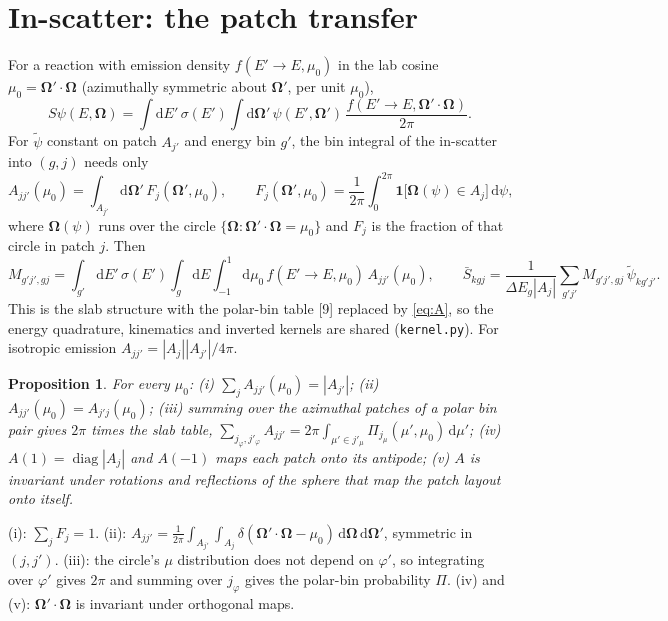 \documentclass[11pt]{article}
\newtheorem{proposition}{Proposition}
\newcommand{\tpsi}{\tilde\psi}
\newcommand{\Sbar}{\bar S}
\newcommand{\Om}{\boldsymbol\Omega}
\begin{document}
\section{In-scatter: the patch transfer}

For a reaction with emission density $f(E'\!\to E,\mu_0)$ in the lab cosine
$\mu_0=\Om'\cdot\Om$ (azimuthally symmetric about $\Om'$, per unit $\mu_0$),
\begin{equation}
  S\psi(E,\Om) = \int\!\mathrm dE'\,\sigma(E')\int\!\mathrm d\Om'\,
  \psi(E',\Om')\,\frac{f(E'\!\to E,\Om'\cdot\Om)}{2\pi}.
\end{equation}
For $\tpsi$ constant on patch $A_{j'}$ and energy bin $g'$, the bin integral of the
in-scatter into $(g,j)$ needs only
\begin{equation}
  A_{jj'}(\mu_0) = \int_{A_{j'}}\!\mathrm d\Om'\,F_j(\Om',\mu_0),
  \qquad F_j(\Om',\mu_0) = \frac{1}{2\pi}\int_0^{2\pi}
  \mathbf 1\big[\Om(\psi)\in A_j\big]\,\mathrm d\psi ,
  \label{eq:A}
\end{equation}
where $\Om(\psi)$ runs over the circle $\{\Om:\Om'\cdot\Om=\mu_0\}$ and $F_j$ is the
fraction of that circle in patch $j$. Then
\begin{equation}
  M_{g'j',gj} = \int_{g'}\!\mathrm dE'\,\sigma(E')\int_g\!\mathrm dE\int_{-1}^1
  \!\mathrm d\mu_0\, f(E'\!\to E,\mu_0)\,A_{jj'}(\mu_0),\qquad
  \Sbar_{kgj} = \frac{1}{\Delta E_g|A_j|}\sum_{g'j'}M_{g'j',gj}\,\tpsi_{kg'j'} .
\end{equation}
This is the slab structure with the polar-bin table [9] replaced by \eqref{eq:A}, so
the energy quadrature, kinematics and inverted kernels are shared
(\texttt{kernel.py}). For isotropic emission $A_{jj'} = |A_j||A_{j'}|/4\pi$.

\begin{proposition}
For every $\mu_0$: (i) $\sum_j A_{jj'}(\mu_0) = |A_{j'}|$; (ii)
$A_{jj'}(\mu_0)=A_{j'j}(\mu_0)$; (iii) summing over the azimuthal patches of a polar
bin pair gives $2\pi$ times the slab table,
$\sum_{j_\varphi,j'_\varphi} A_{jj'} = 2\pi\int_{\mu'\in j'_\mu}\Pi_{j_\mu}(\mu',\mu_0)
\,\mathrm d\mu'$; (iv) $A(1) = \operatorname{diag}|A_j|$ and $A(-1)$ maps each patch
onto its antipode; (v) $A$ is invariant under rotations and reflections of the sphere
that map the patch layout onto itself.
\end{proposition}
\noindent (i): $\sum_j F_j=1$. (ii): $A_{jj'} = \frac{1}{2\pi}\int_{A_{j'}}\int_{A_j}
\delta(\Om'\cdot\Om-\mu_0)\,\mathrm d\Om\,\mathrm d\Om'$, symmetric in $(j,j')$.
(iii): the circle's $\mu$ distribution does not depend on $\varphi'$, so integrating
over $\varphi'$ gives $2\pi$ and summing over $j_\varphi$ gives the polar-bin
probability $\Pi$. (iv) and (v): $\Om'\cdot\Om$ is invariant under orthogonal maps.
\end{document}
